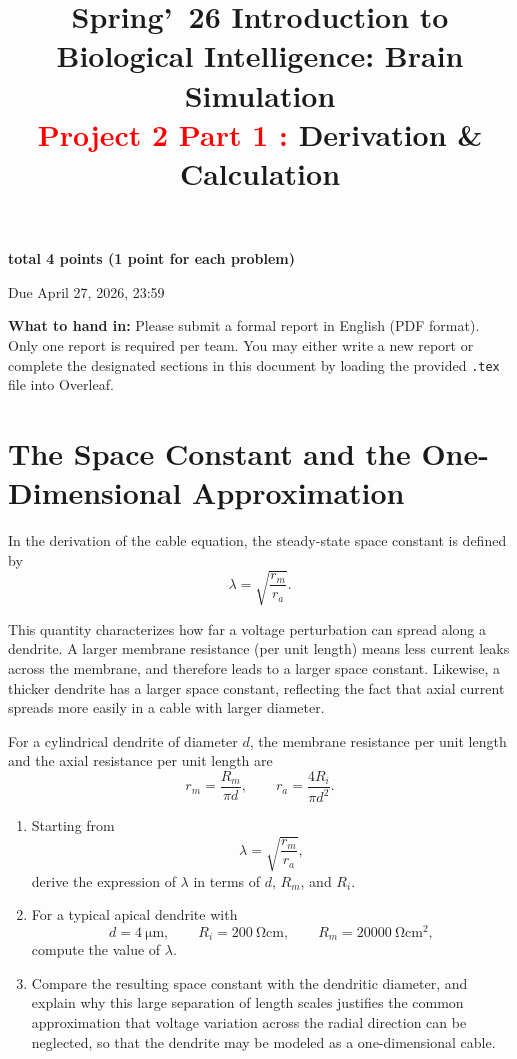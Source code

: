 \documentclass{article}
\title{\textbf{Spring'\ 26 \; Introduction to Biological Intelligence: Brain Simulation\\ \textcolor{red}{Project 2 Part 1 :} Derivation \& Calculation}}
\author{}
\date{}
\begin{document}
\pagestyle{plain}
\maketitle

\vspace{-3.5em}

{\centering
\bf total 4 points (1 point for each problem)\par
Due April 27, 2026, 23:59\par
}
\vspace{0.5em}

{\bf What to hand in:}
Please submit a formal report in English (PDF format).
Only one report is required per team. 
You may either write a new report or complete the designated sections in this document by loading the provided \texttt{.tex} file into Overleaf.

\clearpage

\section{The Space Constant and the One-Dimensional Approximation}

In the derivation of the cable equation, the steady-state space constant is defined by
\[
\lambda=\sqrt{\frac{r_m}{r_a}}.
\]

This quantity characterizes how far a voltage perturbation can spread along a dendrite.
A larger membrane resistance (per unit length) means less current leaks across the membrane, and therefore leads to a larger space constant.
Likewise, a thicker dendrite has a larger space constant, reflecting the fact that axial current spreads more easily in a cable with larger diameter.

For a cylindrical dendrite of diameter $d$, the membrane resistance per unit length and the axial resistance per unit length are
\[
r_m=\frac{R_m}{\pi d},
\qquad
r_a=\frac{4R_i}{\pi d^2}.
\]

\begin{enumerate}
    \item Starting from
    \[
    \lambda=\sqrt{\frac{r_m}{r_a}},
    \]
    derive the expression of $\lambda$ in terms of $d$, $R_m$, and $R_i$.

    \item For a typical apical dendrite with
    \[
    d=\SI{4}{\micro\meter},
    \qquad
    R_i=\SI{200}{\ohm\centi\meter},
    \qquad
    R_m=\SI{20000}{\ohm\centi\meter\squared},
    \]
    compute the value of $\lambda$.

    \item Compare the resulting space constant with the dendritic diameter, and explain why this large separation of length scales justifies the common approximation that voltage variation across the radial direction can be neglected, so that the dendrite may be modeled as a one-dimensional cable.
\end{enumerate}
\end{document}

